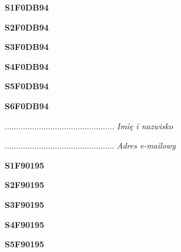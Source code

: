 \begin{turn}{90}\huge \textbf{S1F0DB94}\end{turn}

\begin{turn}{90}\huge \textbf{S2F0DB94}\end{turn}

\begin{turn}{90}\huge \textbf{S3F0DB94}\end{turn}

\begin{turn}{90}\huge \textbf{S4F0DB94}\end{turn}

\begin{turn}{90}\huge \textbf{S5F0DB94}\end{turn}

\begin{turn}{90}\huge \textbf{S6F0DB94}\end{turn}

\begin{turn}{90}\begin{minipage}{\linewidth} \vspace{20mm} ................................................  \textit{Imię i nazwisko}\end{minipage}\end{turn}

\begin{turn}{90}\begin{minipage}{\linewidth} \vspace{20mm} ................................................  \textit{Adres e-mailowy}\end{minipage}\end{turn}

\begin{turn}{90}\huge \textbf{S1F90195}\end{turn}

\begin{turn}{90}\huge \textbf{S2F90195}\end{turn}

\begin{turn}{90}\huge \textbf{S3F90195}\end{turn}

\begin{turn}{90}\huge \textbf{S4F90195}\end{turn}

\begin{turn}{90}\huge \textbf{S5F90195}\end{turn}

